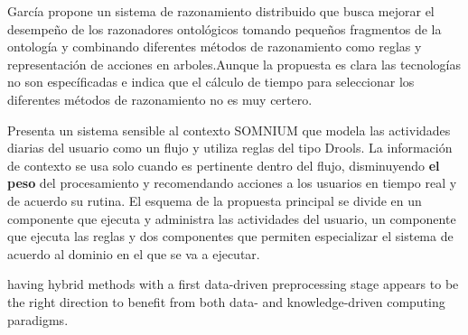 \cite{Garcia-Sola2014} García propone un sistema de razonamiento distribuido que busca mejorar el desempeño de los razonadores ontológicos tomando pequeños fragmentos de la ontología y combinando diferentes métodos de razonamiento como reglas y representación de acciones en arboles.Aunque la propuesta es clara las tecnologías no son específicadas e indica que el cálculo de tiempo para seleccionar los diferentes métodos de razonamiento no es muy certero.

\cite{Avenoglu2017} Presenta un sistema sensible al contexto SOMNIUM que modela las actividades diarias del usuario como un flujo y utiliza reglas del tipo Drools. La información de contexto se usa solo cuando es pertinente dentro del flujo, disminuyendo \textbf{el peso} del procesamiento y recomendando acciones a los usuarios en tiempo real y de acuerdo su rutina. El esquema de la propuesta principal se divide en un componente que ejecuta y administra las actividades del usuario, un componente que ejecuta las reglas y dos componentes que permiten especializar el sistema de acuerdo al dominio en el que se va a ejecutar.



\cite{Iaz2014} 
having hybrid methods with a first data-driven preprocessing stage appears to be the right direction
to benefit from both data- and knowledge-driven computing paradigms.











